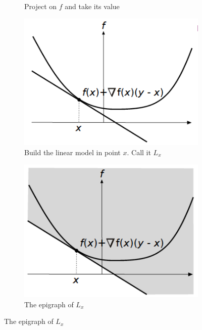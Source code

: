 \begin{figure}
\begin{subfigure}{0.31\textwidth}
    \caption{Project on $f$ and take its value} \label{fig:foc3}
    \end{subfigure}
    \begin{subfigure}{0.31\textwidth}
    \includegraphics[width=\linewidth]{figures/2/first-order-convex/4.png}
    \caption{Build the linear model in point $x$. Call it $L_x$} \label{fig:foc4}
    \end{subfigure}
    \hspace*{\fill} %
    \begin{subfigure}{0.31\textwidth}
    \includegraphics[width=\linewidth]{figures/2/first-order-convex/5.png}
    \caption{The epigraph of $L_x$} \label{fig:foc5}
    \end{subfigure}

\end{figure}

